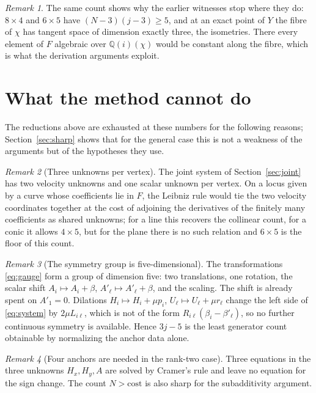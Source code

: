 \documentclass[11pt]{article}
\theoremstyle{remark}
\newtheorem{remark}{Remark}
\begin{document}
\begin{remark}
The same count shows why the earlier witnesses stop where they do:
$8\times4$ and $6\times5$ have $(N-3)(j-3)\ge5$, and at an exact point
of $Y$ the fibre of $\chi$ has tangent space of dimension exactly
three, the isometries. There every element of $F$ algebraic over
$\mathbb Q(i)(\chi)$ would be constant along the fibre, which is what
the derivation arguments exploit.
\end{remark}

\section{What the method cannot do}
\label{sec:limits}
The reductions above are exhausted at these numbers for the following
reasons; Section~\ref{sec:sharp} shows that for the general case this
is not a weakness of the arguments but of the hypotheses they use.

\begin{remark}[Three unknowns per vertex]
The joint system of Section~\ref{sec:joint} has two velocity
unknowns and one scalar unknown per vertex. On a locus given by a
curve whose coefficients lie in $F$, the Leibniz rule would tie the
two velocity coordinates together at the cost of adjoining the
derivatives of the finitely many coefficients as shared unknowns;
for a line this recovers the collinear count, for a conic it allows
$4\times5$, but for the plane there is no such relation and
$6\times5$ is the floor of this count.
\end{remark}

\begin{remark}[The symmetry group is five-dimensional]
The transformations \eqref{eq:gauge} form a group of dimension five:
two translations, one rotation, the scalar shift
$A_i\mapsto A_i+\beta$, $A'_\ell\mapsto A'_\ell+\beta$, and the
scaling. The shift is already spent on $A'_1=0$. Dilations
$H_i\mapsto H_i+\mu p_i$, $U_\ell\mapsto U_\ell+\mu r_\ell$ change the
left side of \eqref{eq:system} by $2\mu L_{i\ell}$, which is not of
the form $R_{i\ell}(\beta_i-\beta'_\ell)$, so no further continuous
symmetry is available. Hence $3j-5$ is the least generator count
obtainable by normalizing the anchor data alone.
\end{remark}

\begin{remark}[Four anchors are needed in the rank-two case]
Three equations in the three unknowns $H_x,H_y,A$ are solved by
Cramer's rule and leave no equation for the sign change. The count
$N>\text{cost}$ is also sharp for the subadditivity argument.
\end{remark}
\end{document}
